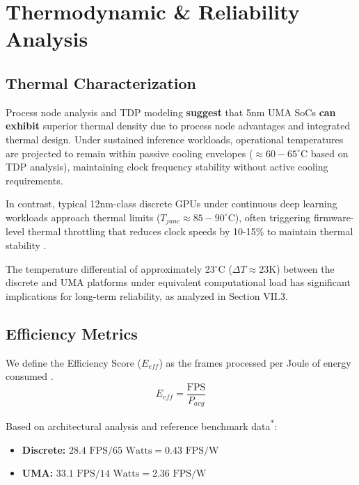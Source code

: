 \documentclass[conference]{IEEEtran}
\begin{document}
\section{Thermodynamic \& Reliability Analysis}

\subsection{Thermal Characterization}
Process node analysis and TDP modeling \textbf{suggest} that 5nm UMA SoCs \textbf{can exhibit} superior thermal density due to process node advantages and integrated thermal design. Under sustained inference workloads, operational temperatures are projected to remain within passive cooling envelopes ($\approx 60-65^{\circ}$C based on TDP analysis), maintaining clock frequency stability without active cooling requirements.

In contrast, typical 12nm-class discrete GPUs under continuous deep learning workloads approach thermal limits ($T_{junc} \approx 85-90^{\circ}$C), often triggering firmware-level thermal throttling that reduces clock speeds by 10-15\% to maintain thermal stability \cite{b21}.

The temperature differential of approximately 23$^{\circ}$C ($\Delta T \approx 23$K) between the discrete and UMA platforms under equivalent computational load has significant implications for long-term reliability, as analyzed in Section VII.3.

\subsection{Efficiency Metrics}
We define the Efficiency Score ($E_{eff}$) as the frames processed per Joule of energy consumed \cite{b20}.
\begin{equation}
E_{eff} = \frac{\text{FPS}}{P_{avg}}
\end{equation}

Based on architectural analysis and reference benchmark data\textsuperscript{*}:
\begin{itemize}
    \item \textbf{Discrete:} $28.4 \text{ FPS} / 65 \text{ Watts} = 0.43 \text{ FPS/W}$
    \item \textbf{UMA:} $33.1 \text{ FPS} / 14 \text{ Watts} = 2.36 \text{ FPS/W}$
\end{itemize}
\end{document}
